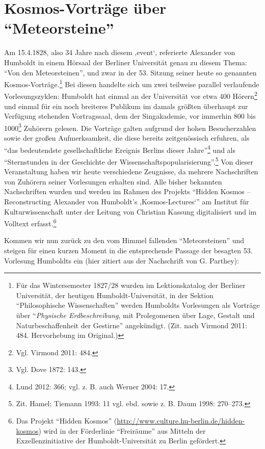 \documentclass[a4paper,
fontsize=11pt,
oneside,
numbers=noperiodatend,
parskip=half-,
bibliography=totoc,
final
]{scrartcl}
\begin{document}
\section*{\texorpdfstring{Kosmos-Vorträge über
\enquote{Meteorsteine}}{Kosmos-Vorträge über Meteorsteine}}\label{kosmos-vortruxe4ge-uxfcber-meteorsteine}

Am 15.4.1828, also 34 Jahre nach diesem ‚event`, referierte Alexander
von Humboldt in einem Hörsaal der Berliner Universität genau zu diesem
Thema: \enquote{Von den Meteorsteinen}, und zwar in der 53. Sitzung
seiner heute so genannten Kosmos-Vorträge.\footnote{Für das
  Wintersemester 1827/28 wurden im Lektionskatalog der Berliner
  Universität, der heutigen Humboldt-Universität, in der Sektion
  \enquote{Philosophische Wissenschaften} werden Humboldts Vorlesungen
  als Vorträge über \enquote{\emph{Physische Erdbeschreibung}, mit
  Prolegomenen über Lage, Gestalt und Naturbeschaffenheit der Gestirne}
  angekündigt. (Zit. nach Virmond 2011: 484. Hervorhebung im Original.)}
Bei diesen handelte sich um zwei teilweise parallel verlaufende
Vorlesungszyklen: Humboldt hat einmal an der Universität vor etwa 400
Hörern\footnote{Vgl. Virmond 2011: 484.} und einmal für ein noch
breiteres Publikum im damals größten überhaupt zur Verfügung stehenden
Vortragssaal, dem der Singakademie, vor immerhin 800 bis 1000\footnote{Vgl.
  Dove 1872: 143.} Zuhörern gelesen. Die Vorträge galten aufgrund der
hohen Besucherzahlen sowie der großen Aufmerksamkeit, die diese bereits
zeitgenössisch erfuhren, als \enquote{das bedeutendste gesellschaftliche
Ereignis Berlins dieser Jahre}\footnote{Lund 2012: 366; vgl. z. B. auch
  Werner 2004: 17.} und als \enquote{Sternstunden in der Geschichte der
Wissenschaftspopularisierung}.\footnote{Zit. Hamel; Tiemann 1993: 11
  vgl. ebd. sowie z. B. Daum 1998: 270--273.} Von dieser Veranstaltung
haben wir heute verschiedene Zeugnisse, da mehrere Nachschriften von
Zuhörern seiner Vorlesungen erhalten sind. Alle bisher bekannten
Nachschriften wurden und werden im Rahmen des Projekts \enquote{Hidden
Kosmos -- Reconstructing Alexander von Humboldt's ‚Kosmos-Lectures`} am
Institut für Kulturwissenschaft unter der Leitung von Christian Kassung
digitalisiert und im Volltext erfasst.\footnote{Das Projekt
  \enquote{Hidden Kosmos}
  (\url{http://www.culture.hu-berlin.de/hidden-kosmos}) wird in der
  Förderlinie \enquote{Freiräume} aus Mitteln der Exzellenzinitiative
  der Humboldt-Universität zu Berlin gefördert.}

Kommen wir nun zurück zu den vom Himmel fallenden
\enquote{Meteorsteinen} und steigen für einen kurzen Moment in die
entsprechende Passage der besagten 53. Vorlesung Humboldts ein (hier
zitiert aus der Nachschrift von G. Parthey):
\end{document}
